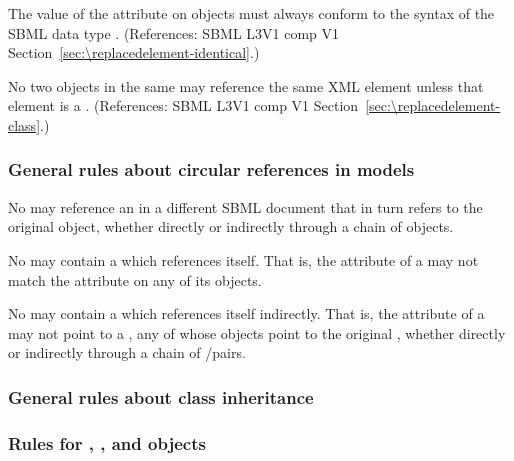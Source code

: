 \begin{sbmlenum}
 { The value of the  attribute on
  \ReplacedElement objects must always conform to the syntax of
  the SBML data type .
  (References: SBML L3V1 comp V1 Section~\ref{sec:\replacedelement-identical}.) }


 { No two \ReplacedElement objects in the same \Model
  may reference the same XML element unless that element is a \Deletion.
  (References: SBML L3V1 comp V1 Section~\ref{sec:\replacedelement-class}.) }
  







\end{sbmlenum} \subsubsection*{General rules about circular references in models} \begin{sbmlenum}

 { No \ExternalModelDefinition may reference an
  \ExternalModelDefinition in a different SBML document that in turn
  refers to the original \ExternalModelDefinition object, whether
  directly or indirectly through a chain of \ExternalModelDefinition objects.} 

 { No \Model may contain a \Submodel which references
  itself.  That is, the  attribute of a \Model may not match the
   attribute on any of its \Submodel objects.} 

 { No \Model may contain a \Submodel which references
  itself indirectly.  That is, the  attribute of a \Submodel may
  not point to a \Model, any of whose \Submodel objects point to the original
  \Model, whether directly or indirectly through a chain of
  \Model/\Submodel pairs.} 


\end{sbmlenum} \subsubsection*{General rules about class inheritance} \begin{sbmlenum}

\end{sbmlenum} \subsubsection*{Rules for , ,  and  objects} \begin{sbmlenum}



\end{sbmlenum}

